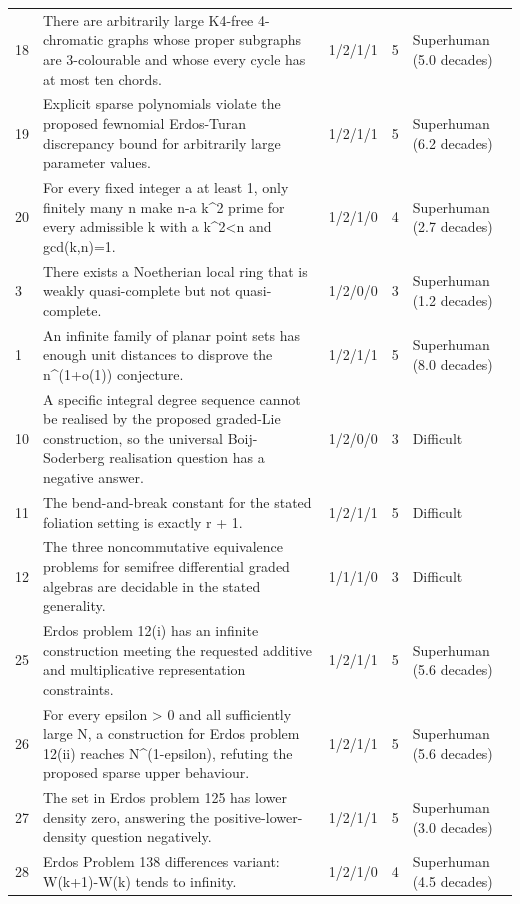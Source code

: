 \begin{landscape}
\begin{longtable}{@{}L{14mm}L{91mm}C{25mm}C{12mm}L{43mm}@{}}
18 & There are arbitrarily large K4-free 4-chromatic graphs whose proper subgraphs are 3-colourable and whose every cycle has at most ten chords. & 1/2/1/1 & 5 & Superhuman (5.0 decades) \\
19 & Explicit sparse polynomials violate the proposed fewnomial Erdos-Turan discrepancy bound for arbitrarily large parameter values. & 1/2/1/1 & 5 & Superhuman (6.2 decades) \\
20 & For every fixed integer a at least 1, only finitely many n make n-a k\textasciicircum{}2 prime for every admissible k with a k\textasciicircum{}2<n and gcd(k,n)=1. & 1/2/1/0 & 4 & Superhuman (2.7 decades) \\
3 & There exists a Noetherian local ring that is weakly quasi-complete but not quasi-complete. & 1/2/0/0 & 3 & Superhuman (1.2 decades) \\
1 & An infinite family of planar point sets has enough unit distances to disprove the n\textasciicircum{}(1+o(1)) conjecture. & 1/2/1/1 & 5 & Superhuman (8.0 decades) \\
10 & A specific integral degree sequence cannot be realised by the proposed graded-Lie construction, so the universal Boij-Soderberg realisation question has a negative answer. & 1/2/0/0 & 3 & Difficult \\
11 & The bend-and-break constant for the stated foliation setting is exactly r + 1. & 1/2/1/1 & 5 & Difficult \\
12 & The three noncommutative equivalence problems for semifree differential graded algebras are decidable in the stated generality. & 1/1/1/0 & 3 & Difficult \\
25 & Erdos problem 12(i) has an infinite construction meeting the requested additive and multiplicative representation constraints. & 1/2/1/1 & 5 & Superhuman (5.6 decades) \\
26 & For every epsilon > 0 and all sufficiently large N, a construction for Erdos problem 12(ii) reaches N\textasciicircum{}(1-epsilon), refuting the proposed sparse upper behaviour. & 1/2/1/1 & 5 & Superhuman (5.6 decades) \\
27 & The set in Erdos problem 125 has lower density zero, answering the positive-lower-density question negatively. & 1/2/1/1 & 5 & Superhuman (3.0 decades) \\
28 & Erdos Problem 138 differences variant: W(k+1)-W(k) tends to infinity. & 1/2/1/0 & 4 & Superhuman (4.5 decades) \\

\end{longtable}
\end{landscape}
